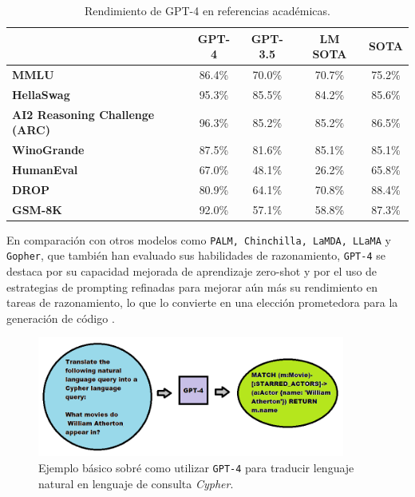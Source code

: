 \begin{table}[H]
  \centering
  \caption{Rendimiento de GPT-4 en referencias académicas. \cite{}}
  \begin{tabularx}{\textwidth}{Xcccc}
    \toprule
    & \textbf{GPT-4} & \textbf{GPT-3.5} & \textbf{LM SOTA} & \textbf{SOTA} \\
    \midrule
    \textbf{MMLU} & 86.4\% & 70.0\% & 70.7\% & 75.2\% \\
    \textbf{HellaSwag} & 95.3\% & 85.5\% & 84.2\% & 85.6\% \\
    \textbf{AI2 Reasoning Challenge (ARC)} & 96.3\% & 85.2\% & 85.2\% & 86.5\% \\
    \textbf{WinoGrande} & 87.5\% & 81.6\% & 85.1\% & 85.1\% \\
    \textbf{HumanEval} & 67.0\% & 48.1\% & 26.2\% & 65.8\% \\
    \textbf{DROP} & 80.9\% & 64.1\% & 70.8\% & 88.4\% \\
    \textbf{GSM-8K} & 92.0\% & 57.1\% & 58.8\% & 87.3\% \\
    \bottomrule
  \end{tabularx}
  \label{tab:my_label}
\end{table}

En comparación con otros modelos como \texttt{PALM, Chinchilla, LaMDA, LLaMA} y \texttt{Gopher}, que también han evaluado sus habilidades de razonamiento,  \texttt{GPT-4} se destaca por su capacidad mejorada de aprendizaje zero-shot y por el uso de estrategias de prompting refinadas para mejorar aún más su rendimiento en tareas de razonamiento, lo que lo convierte en una elección prometedora para la generación de código \cite{}.

\begin{figure}[H]\label{simplegpt4}
	\centering
	\includegraphics[width = 0.9\textwidth]{./Graphics/simplegpt4use}
	\caption{Ejemplo básico sobré como utilizar \texttt{GPT-4} para traducir lenguaje natural en lenguaje de consulta \textit{Cypher}.}
\end{figure}

